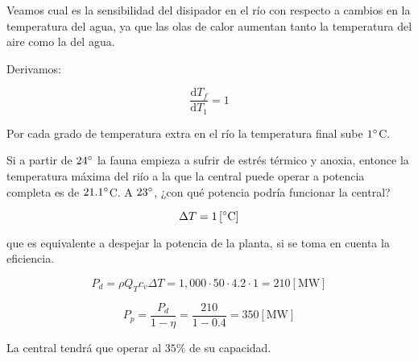 \documentclass[11pt]{article}
\begin{document}
Veamos cual es la sensibilidad del disipador en el río con respecto a cambios en la temperatura del agua, ya que las olas de calor aumentan tanto la temperatura del aire como la del agua.

Derivamos:

\[ \frac{ \mathrm d T_f }{ \mathrm d T_1 } = 1 \]

Por cada grado de temperatura extra en el río la temperatura final sube \( 1 \degree \)C.

Si a partir de \( 24 \degree \) la fauna empieza a sufrir de estrés térmico y anoxia, entonce la temperatura máxima del riío a la que la central puede operar a potencia completa es de \( 21.1 \degree \)C. A \( 23 \degree \), ¿con qué potencia podría funcionar la central?

\[ \Delta T = 1 \left[ \degree \text{C} \right] \]

que es equivalente a despejar la potencia de la planta, si se toma en cuenta la eficiencia.

\[ P_d = \rho Q_T c_v \Delta T = 1,000 \cdot 50 \cdot 4.2 \cdot 1 = 210 \left[ \text{MW} \right] \]

\[ P_p = \frac{P_d}{1 - \eta} = \frac{210}{1 - 0.4} = 350 \left[ \text{MW} \right] \]

La central tendrá que operar al \( 35\% \) de su capacidad. 

\end{document}
